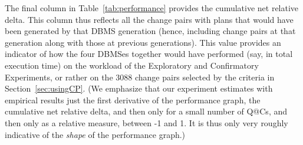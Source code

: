 \documentclass[prodmode,acmtods]{acmsmall}
\begin{document}
\begin{table}[t]
\end{table}

The final column in Table~\ref{tab:performance} provides the
cumulative net relative delta.  This column thus reflects all the change pairs
with plans that would have been generated by that DBMS generation
(hence, including change pairs at that generation along with those
at previous generations). This value provides an indicator of how the four
\hbox{DBMSes} together would have performed (say, in total execution time) on the
workload of the Exploratory and Confirmatory
Experiments, or rather on the 3088 change pairs selected by the criteria in
Section~\ref{sec:usingCP}. (We emphasize that our experiment estimates with
empirical results just
the first derivative of the performance graph, the cumulative net 
relative delta, and then only for a small
number of Q@Cs, and then only as a relative measure, between -1 and 1. It is
thus only very roughly indicative of the {\em shape} of the performance
graph.)
\end{document}
